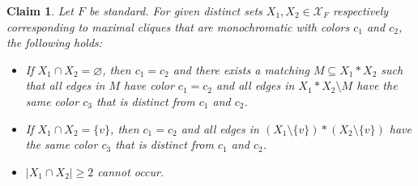 \documentclass[a4paper,11pt]{article}
\newtheorem{claim}[theorem]{Claim}
\numberwithin{equation}{section}
\newcommand{\mX}{\mathcal{X}}
\begin{document}
\begin{claim}\label{lem:Claim_4}
Let $F$ be standard. 
For given distinct sets $X_1,X_2\in\mX_F$ respectively corresponding to maximal cliques that are monochromatic with colors $c_1$ and $c_2$, the following holds:
    \begin{itemize}
        \item If $X_1\cap X_2 = \varnothing$, then $c_1 = c_2$ and there exists a matching  $M\subseteq X_1\ast X_2$ such that all edges in $M$ have color $c_1=c_2$ and all edges in $X_1\ast X_2 \setminus M$ have the same color $c_3$ that is distinct from $c_1$ and $c_2$.
        \item If $X_1\cap X_2= \{v\}$, then $c_1 = c_2$ and all edges in $(X_1\setminus \{v\})\ast (X_2\setminus \{v\})$ have the same color $c_3$ that is distinct from $c_1$ and $c_2$.
        \item $|X_1\cap X_2| \geq 2$ cannot occur.
    \end{itemize}
\end{claim}
\end{document}
